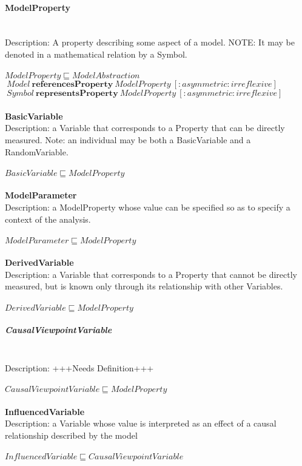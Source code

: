 \paragraph{ModelProperty}\\
Description: A property describing some aspect of a model. NOTE: It may be denoted in a mathematical relation by a Symbol.\\
\\$ ModelProperty \sqsubseteq ModelAbstraction$
\\$\: Model\: \textbf{referencesProperty}\: ModelProperty\:  [:asymmetric :irreflexive]$
\\$\: Symbol\: \textbf{representsProperty}\: ModelProperty\:  [:asymmetric :irreflexive]$
\\\\   \textbf{BasicVariable}\\Description: a Variable that corresponds to a Property that can be directly measured. Note: an individual may be both a BasicVariable and a RandomVariable.\\
\\$ BasicVariable \sqsubseteq ModelProperty$
\\\\   \textbf{ModelParameter}\\Description: a ModelProperty whose value can be specified so as to specify a context of the analysis.\\
\\$ ModelParameter \sqsubseteq ModelProperty$
\\\\   \textbf{DerivedVariable}\\Description: a Variable that corresponds to a Property that cannot be directly measured, but is known only through its relationship with other Variables.\\
\\$ DerivedVariable \sqsubseteq ModelProperty$
\subparagraph{CausalViewpointVariable}\\
Description: +++Needs Definition+++\\
\\$ CausalViewpointVariable \sqsubseteq ModelProperty$
\\\\   \textbf{InfluencedVariable}\\Description: a Variable whose value is interpreted as an effect of a causal relationship described by the model\\
\\$ InfluencedVariable \sqsubseteq CausalViewpointVariable$
